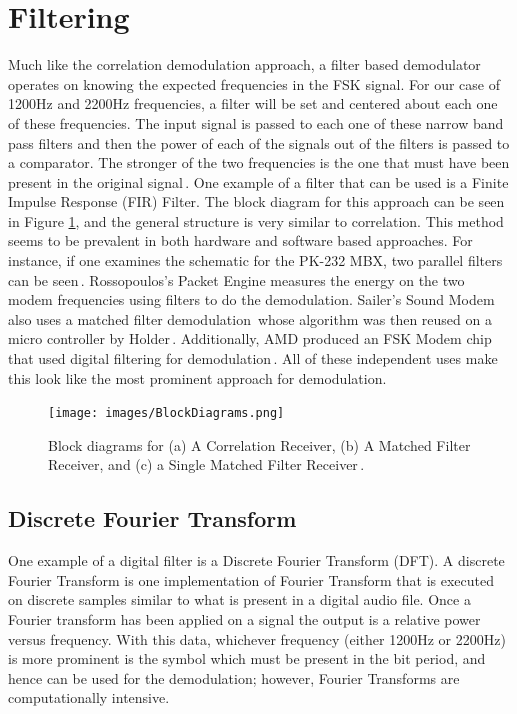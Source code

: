 \section{Filtering}
Much like the correlation demodulation approach, a filter based demodulator operates on knowing the expected frequencies in the FSK signal. For our case of 1200Hz and 2200Hz frequencies, a filter will be set and centered about each one of these frequencies. The input signal is passed to each one of these narrow band pass filters and then the power of each of the signals out of the filters is passed to a comparator. The stronger of the two frequencies is the one that must have been present in the original signal\,\cite{Watson1980}. One example of a filter that can be used is a Finite Impulse Response (FIR) Filter. The block diagram for this approach can be seen in Figure \ref{BlockDiagrams}, and the general structure is very similar to correlation. This method seems to be prevalent in both hardware and software based approaches. For instance, if one examines the schematic for the PK-232 MBX, two parallel filters can be seen\,\cite{Inc.2001}. Rossopoulos's Packet Engine measures the energy on the two modem frequencies using filters to do the demodulation. Sailer's Sound Modem also uses a matched filter demodulation\,\cite{Sailer1995} whose algorithm was then reused on a micro controller by Holder\,\cite{Holder2012}. Additionally, AMD produced an FSK Modem chip that used digital filtering for demodulation\,\cite{Devices1989}. All of these independent uses make this look like the most prominent approach for demodulation. 

\begin{figure}
  \centering
	\texttt{[image: images/BlockDiagrams.png]} 
	\caption{Block diagrams for (a) A Correlation Receiver, (b) A Matched Filter Receiver, and (c) a Single Matched Filter Receiver\,\cite{J.Das1986}.}
   \label{BlockDiagrams}
\end{figure}

\subsection{Discrete Fourier Transform}
One example of a digital filter is a Discrete Fourier Transform (DFT). A discrete Fourier Transform is one implementation of Fourier Transform that is executed on discrete samples similar to what is present in a digital audio file. Once a Fourier transform has been applied on a signal the output is a relative power versus frequency. With this data, whichever frequency (either 1200Hz or 2200Hz) is more prominent is the symbol which must be present in the bit period, and hence can be used for the demodulation; however, Fourier Transforms are computationally intensive.

